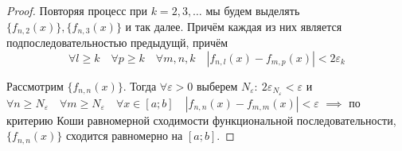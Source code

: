 \begin{proof}
    Повторяя процесс при $k = 2,3,\dots$ мы будем выделять 
    $\{ f_{n,2}(x) \}, \{ f_{n,3}(x) \}$ и так далее. Причём каждая из них
    является подпоследовательностью предыдущй, причём 
    \[ 
        \forall l \geq k \quad \forall p \geq k \quad \forall m,n,k \quad 
        |f_{n,l}(x) - f_{m,p}(x)| < 2\varepsilon_k
    \]

    Рассмотрим $\{ f_{n,n}(x) \}$. Тогда $\forall \varepsilon > 0$ выберем
    $N_\varepsilon: \: 2\varepsilon_{N_\varepsilon} < \varepsilon$ и
    $\forall n \geq N_\varepsilon \quad \forall m \geq N_\varepsilon \quad
    \forall x \in [a; b] \quad |f_{n,n}(x) - f_{m,m}(x)| < \varepsilon$ 
    $\implies$ по критерию Коши равномерной сходимости функциональной
    последовательности, $\{ f_{n,n}(x) \}$ сходится равномерно на $[a; b]$.
\end{proof}